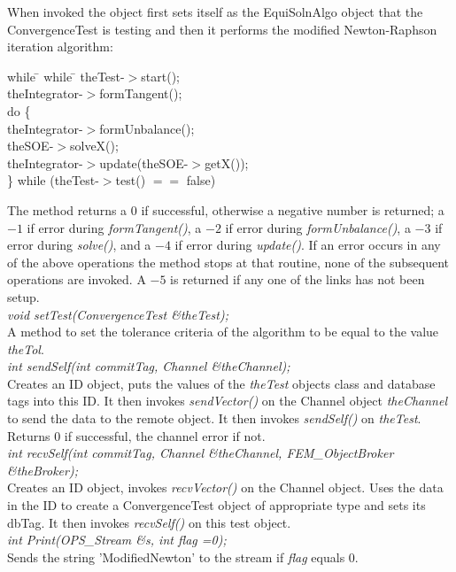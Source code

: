 When invoked the object first sets itself as the EquiSolnAlgo object
that the ConvergenceTest is testing and then it performs the
modified Newton-Raphson iteration algorithm: 
\begin{tabbing}
while \= \+ while \= \kill
theTest-$>$start(); \\
theIntegrator-$>$formTangent(); \\
do \{ \+ \\
theIntegrator-$>$formUnbalance(); \\
theSOE-$>$solveX(); \\
theIntegrator-$>$update(theSOE-$>$getX()); \- \\
\} while (theTest-$>$test() $==$ false)\- \\
\end{tabbing}


\noindent The method returns a 0 if successful, otherwise a negative number is
returned; a $-1$ if error during {\em formTangent()}, a $-2$ if
error during {\em formUnbalance()}, a $-3$ if error during {\em
solve()}, and a $-4$ if error during {\em update()}.
If an error occurs in any of the above operations the method stops at
that routine, none of the subsequent operations are invoked. A $-5$ is
returned if any one of the links has not been setup.\\

{\em void setTest(ConvergenceTest \&theTest);} \\
A method to set the tolerance criteria of the algorithm to be equal to
the value {\em theTol}. \\

{\em int sendSelf(int commitTag, Channel \&theChannel);}\\
Creates an ID object, puts the values of the {\em theTest} objects
class and database tags into this ID.
It then invokes {\em sendVector()} on the Channel object {\em
theChannel} to send the data to the remote object. It then invokes
{\em sendSelf()} on {\em theTest}. Returns $0$ if successful, the
 channel error if not. \\

{\em int recvSelf(int commitTag, Channel \&theChannel, FEM\_ObjectBroker
\&theBroker);}\\ 
Creates an ID object, invokes {\em recvVector()} on the Channel
object. Uses the data in the ID to create a ConvergenceTest object of
appropriate type and sets its dbTag. It then invokes {\em recvSelf()}
on this test object.  \\

{\em int Print(OPS_Stream \&s, int flag =0);} \\
Sends the string 'ModifiedNewton' to the stream if {\em flag} equals $0$.
